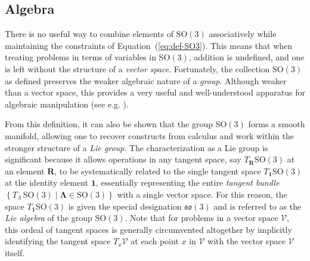 \hypertarget{algebra}{%
\subsection{Algebra}\label{algebra}}

There is no useful way to combine elements of
\(\mathrm{SO}(3)\) associatively %
while maintaining the constraints of Equation~(\ref{eq:def-SO3}).
This means that when treating problems in terms of variables 
in \(\mathrm{SO}(3)\), addition is undefined, and one is left without the structure of a \emph{vector space}.
Fortunately, the collection \(\mathrm{SO}(3)\) as
defined preserves the weaker algebraic nature of a \emph{group}.
Although weaker than a vector space, this provides a very useful and
well-understood apparatus for algebraic manipulation (see e.g.
\cite{artin1991algebra}).

From this definition, it can also be shown that the group
\(\mathrm{SO}(3)\) forms a smooth manifold, allowing one to recover
constructs from calculus and work within the stronger structure of a
\emph{Lie group}.
The characterization as a Lie group is significant
because it allows operations in any tangent space, say
\(T_{\bm{R}}\mathrm{SO}(3)\) at an element \(\bm{R}\),
to be systematically related to the single tangent space
\(T_{\bm{1}}\mathrm{SO}(3)\) at the identity element \(\bm{1}\),
essentially representing the entire \emph{tangent bundle} \(\left\{T_{\scriptscriptstyle{\Lambda}}\,\mathrm{SO}(3)\mid \bm{\Lambda}\in\mathrm{SO}(3)\right\}\) %
with a single vector space.
For this reason, the space \(T_{\bm{1}}\mathrm{SO}(3)\)
is given the special designation \(\mathfrak{so}(3)\) and is referred to
as the \emph{Lie algebra} of the group \(\mathrm{SO}(3)\).
Note that for problems in a vector space \(\mathcal{V}\),
this ordeal of tangent spaces %
is generally circumvented altogether by implicitly
identifying the tangent space \(T_x\mathcal{V}\) at each point \(x\) in
\(\mathcal{V}\) with the vector space \(\mathcal{V}\) itself.

